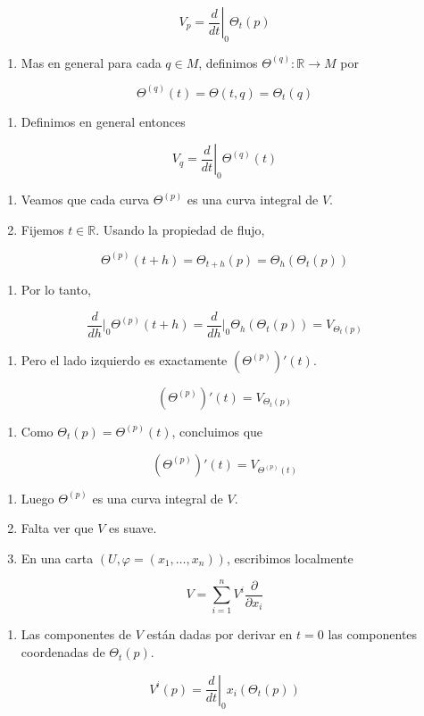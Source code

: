\begin{bookproof}{}
\[
V_p=\left.\frac{d}{dt}\right|_{0}\Theta_t(p)
\]
\begin{enumerate}[start=3]
\item Mas en general para cada $q\in M$, definimos $\Theta^{(q)}:\mathbb R\to M$ por
\end{enumerate}
\[
\Theta^{(q)}(t)=\Theta(t,q)=\Theta_t(q)
\]
\begin{enumerate}[start=4]
\item Definimos en general entonces
\end{enumerate}
\[
V_q=\left.\frac{d}{dt}\right|_{0}\Theta^{(q)}(t)
\]
\begin{enumerate}[start=5]
\item Veamos que cada curva $\Theta^{(p)}$ es una curva integral de $V$.
\item Fijemos $t\in\mathbb R$. Usando la propiedad de flujo,
\end{enumerate}
\[
\Theta^{(p)}(t+h)=\Theta_{t+h}(p)=\Theta_h(\Theta_t(p))
\]
\begin{enumerate}[start=7]
\item Por lo tanto,
\end{enumerate}
\[
\frac{d}{dh}\bigg|_{0}\Theta^{(p)}(t+h)=\frac{d}{dh}\bigg|_{0}\Theta_h(\Theta_t(p))=V_{\Theta_t(p)}
\]
\begin{enumerate}[start=8]
\item Pero el lado izquierdo es exactamente $(\Theta^{(p)})'(t)$.
\end{enumerate}
\[
(\Theta^{(p)})'(t)=V_{\Theta_t(p)}
\]
\begin{enumerate}[start=9]
\item Como $\Theta_t(p)=\Theta^{(p)}(t)$, concluimos que
\end{enumerate}
\[
(\Theta^{(p)})'(t)=V_{\Theta^{(p)}(t)}
\]
\begin{enumerate}[start=10]
\item Luego $\Theta^{(p)}$ es una curva integral de $V$.
\item Falta ver que $V$ es suave.
\item En una carta $(U,\varphi=(x_1,\ldots,x_n))$, escribimos localmente
\end{enumerate}
\[
V=\sum_{i=1}^n V^i\frac{\partial}{\partial x_i}
\]
\begin{enumerate}[start=13]
\item Las componentes de $V$ están dadas por derivar en $t=0$ las componentes coordenadas de $\Theta_t(p)$.
\end{enumerate}
\[
V^i(p)=\left.\frac{d}{dt}\right|_0 x_i(\Theta_t(p))
\]
\end{bookproof}
